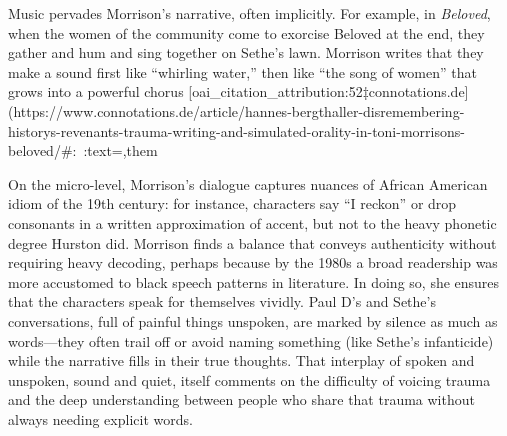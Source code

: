 \documentclass[12pt]{report}
\begin{document}
Music pervades Morrison’s narrative, often implicitly. For example, in \textit{Beloved}, when the women of the community come to exorcise Beloved at the end, they gather and hum and sing together on Sethe’s lawn. Morrison writes that they make a sound first like “whirling water,” then like “the song of women” that grows into a powerful chorus [oai_citation_attribution:52‡connotations.de](https://www.connotations.de/article/hannes-bergthaller-disremembering-historys-revenants-trauma-writing-and-simulated-orality-in-toni-morrisons-beloved/#:~:text=,them%

On the micro-level, Morrison’s dialogue captures nuances of African American idiom of the 19th century: for instance, characters say “I reckon” or drop consonants in a written approximation of accent, but not to the heavy phonetic degree Hurston did. Morrison finds a balance that conveys authenticity without requiring heavy decoding, perhaps because by the 1980s a broad readership was more accustomed to black speech patterns in literature. In doing so, she ensures that the characters speak for themselves vividly. Paul D’s and Sethe’s conversations, full of painful things unspoken, are marked by silence as much as words—they often trail off or avoid naming something (like Sethe’s infanticide) while the narrative fills in their true thoughts. That interplay of spoken and unspoken, sound and quiet, itself comments on the difficulty of voicing trauma and the deep understanding between people who share that trauma without always needing explicit words.
\end{document}
